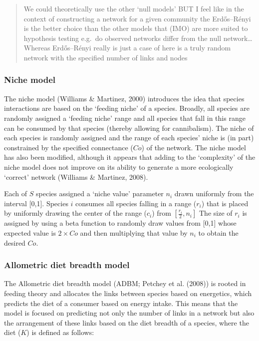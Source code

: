 \documentclass[
]{article}
\begin{document}
\begin{quote}
We could theoretically use the other `null models' BUT I feel like in
the context of constructing a network for a given community the
Erdős--Rényi is the better choice than the other models that (IMO) are
more suited to hypothesis testing e.g.~do observed networks differ from
the null network\ldots{} Whereas Erdős--Rényi really is just a case of
here is a truly random network with the specified number of links and
nodes
\end{quote}

\subsubsection{Niche model}\label{niche-model}

The niche model (Williams \& Martinez, 2000) introduces the idea that
species interactions are based on the `feeding niche' of a species.
Broadly, all species are randomly assigned a `feeding niche' range and
all species that fall in this range can be consumed by that species
(thereby allowing for cannibalism). The niche of each species is
randomly assigned and the range of each species' niche is (in part)
constrained by the specified connectance (\(Co\)) of the network. The
niche model has also been modified, although it appears that adding to
the `complexity' of the niche model does not improve on its ability to
generate a more ecologically `correct' network (Williams \& Martinez,
2008).

Each of \(S\) species assigned a `niche value' parameter \(n_i\) drawn
uniformly from the interval {[}0,1{]}. Species \(i\) consumes all
species falling in a range (\(r_i\)) that is placed by uniformly drawing
the center of the range (\(c_i\)) from \([ \frac{r_i}{2}, n_i ]\) The
size of \(r_i\) is assigned by using a beta function to randomly draw
values from {[}0,1{]} whose expected value is \(2 \times Co\) and then
multiplying that value by \(n_i\) to obtain the desired \(Co\).

\subsubsection{Allometric diet breadth
model}\label{allometric-diet-breadth-model}

The Allometric diet breadth model (ADBM; Petchey et al. (2008)) is
rooted in feeding theory and allocates the links between species based
on energetics, which predicts the diet of a consumer based on energy
intake. This means that the model is focused on predicting not only the
number of links in a network but also the arrangement of these links
based on the diet breadth of a species, where the diet (\(K\)) is
defined as follows:
\end{document}
